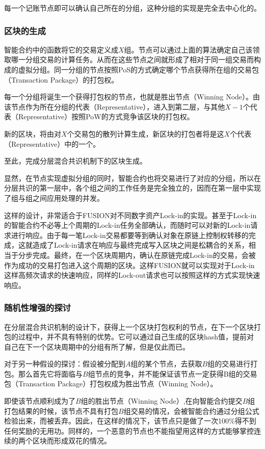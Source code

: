 \documentclass[a4paper,12pt]{article}
\begin{document}
每一个记账节点即可以确认自己所在的分组，这种分组的实现是完全去中心化的。

\subsubsection{区块的生成}

智能合约中的函数将它的交易定义成$X$组。节点可以通过上面的算法确定自己该领取哪一分组交易的计算任务。从而在这些节点之间就形成了相对于同一组交易而构成的虚拟分组。同一分组的节点按照PoS的方式确定哪个节点获得所在组的交易包（Transaction Package）的打包权。

每一个分组将诞生一个获得打包权的节点，也就是胜出节点（Winning Node）。由该节点作为所在分组的代表（Representative），进入到第二层，与其他$X-1$个代表（Representative）按照PoW的方式竞争该区块的打包权。

新的区块，将由对$X$个交易包的散列计算生成，新区块的打包者将是这$X$个代表（Representative）中的一个。

至此，完成分层混合共识机制下的区块生成。

显然，在节点实现虚拟分组的同时，智能合约也将交易进行了对应的分组，所以在分层共识的第一层中，各个组之间的工作任务是完全独立的，因而在第一层中实现了组与组之间应用处理的并发。

这样的设计，非常适合于FUSION对不同数字资产Lock-in的实现。甚至于Lock-in的智能合约不必等上个周期的Lock-in任务全部确认，而随时可以对新的Lock-in请求进行响应。由于每一笔Lock-in交易都要等到确认对象在原链上控制权转移的完成，这就造成了Lock-in请求在响应与最终完成写入区块之间是松耦合的关系，相当于分步完成。最终，在一个区块周期内，确认在原链完成Lock-in的交易，会被作为成功的交易打包进入这个周期的区块。这样FUSION就可以实现对于Lock-in这样高频次请求的快速响应，同样的Lock-out请求也可以按照这样的方式实现快速响应。

\subsubsection{随机性增强的探讨}

在分层混合共识机制的设计下，获得上一个区块打包权利的节点，在下一个区块打包的过程中，并不具有特别的优势。它可以通过自己生成的区块hash值，提前对自己在下一个区块周期中的分组有所了解，但是仅此而已。

对于另一种假设的探讨：假设被分配到$A$组的某个节点，去获取$B$组的交易进行打包。那么首先它将面临与$B$组节点的竞争，并不能保证该节点一定获得B组的交易包（Transaction Package）打包权成为胜出节点（Winning Node）。

即使该节点顺利成为了$B$组的胜出节点（Winning Node）,在向智能合约提交$B$组打包结果的时候，该节点不具有打包$B$组交易的情况，会被智能合约通过分组公式检验出来，而被丢弃。因此，在这样的情况下，该节点只是做了一次100\%得不到任何奖励的无用功。同样的，一个恶意的节点也不能指望用这样的方式能够掌控连续的两个区块而形成双花的情况。
\end{document}
